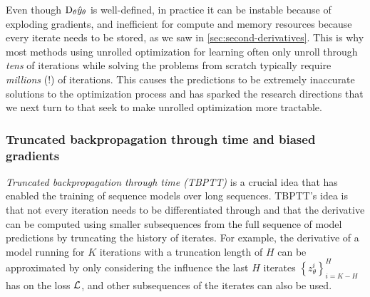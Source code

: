 \documentclass[twoside,11pt]{article}
\begin{document}
Even though $\mathrm{D}_\theta \hat y_\theta$ is well-defined,
in practice it can be
instable because of exploding gradients,
and inefficient for compute and memory resources because
every iterate needs to be stored,
as we saw in \cref{sec:second-derivatives}.
This is why most methods using unrolled optimization for learning
often only unroll through \emph{tens} of iterations
\citep{metz2016unrolled,belanger2017end,foerster2017learning,finn2017model}
while solving the problems from scratch typically
require \emph{millions} (!) of iterations.
This causes the predictions to be extremely inaccurate solutions
to the optimization process and has sparked the research directions
that we next turn to that seek to make unrolled optimization
more tractable.

\subsubsection{Truncated backpropagation through time and biased gradients}
\begin{center}
\end{center}
\vspace{-10mm}

\emph{Truncated backpropagation through time (TBPTT)}
\citep{werbos1990backpropagation,jaeger2002tutorial}
is a crucial idea that has enabled the
training of sequence models over long sequences.
TBPTT's idea is that not every iteration needs to be
differentiated through and that the derivative
can be computed using smaller subsequences from
the full sequence of model predictions by
truncating the history of iterates.
For example, the derivative of a model running
for $K$ iterations with a truncation length of $H$
can be approximated by only considering the
influence the last $H$ iterates
$\left\{z_\theta^{i}\right\}_{i=K-H}^H$ has on the loss ${\mathcal{L}}$,
and other subsequences of the iterates can
also be used.
\end{document}
